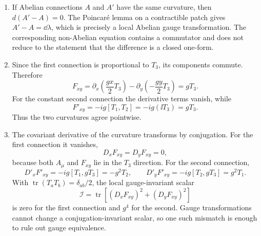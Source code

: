 \begin{enumerate}
  \begin{enumerate}
    \item[(a)]
    If Abelian connections \(A\) and \(A'\) have the same curvature, then
    \(d(A'-A)=0\).  The Poincar\'e lemma on a contractible patch gives
    \(A'-A=\dd\lambda\), which is precisely a local Abelian gauge
    transformation.  The corresponding non-Abelian equation contains a
    commutator and does not reduce to the statement that the difference is
    a closed one-form.
    \item[(b)]
    Since the first connection is proportional to \(T_3\), its components
    commute.  Therefore
    \[
      F_{xy}=\partial_x\left(\frac{gx}{2}T_3\right)
       -\partial_y\left(-\frac{gy}{2}T_3\right)=gT_3.
    \]
    For the constant second connection the derivative terms vanish, while
    \[
      F'_{xy}=-ig[T_1,T_2]
        =-ig(\ii T_3)=gT_3.
    \]
    Thus the two curvatures agree pointwise.
    \item[(c)]
    The covariant derivative of the curvature transforms by conjugation.
    For the first connection it vanishes,
    \[
      D_xF_{xy}=D_yF_{xy}=0,
    \]
    because both \(A_\mu\) and \(F_{xy}\) lie in the \(T_3\) direction.
    For the second connection,
    \[
      D'_xF'_{xy}=-ig[T_1,gT_3]=-g^2T_2,
      \qquad
      D'_yF'_{xy}=-ig[T_2,gT_3]=g^2T_1.
    \]
    With \(\operatorname{tr}(T_aT_b)=\delta_{ab}/2\), the local
    gauge-invariant scalar
    \[
      \mathcal I=\operatorname{tr}\!\left[
        (D_xF_{xy})^2+(D_yF_{xy})^2\right]
    \]
    is zero for the first connection and \(g^4\) for the second.  Gauge
    transformations cannot change a conjugation-invariant scalar, so one
    such mismatch is enough to rule out gauge equivalence.
  \end{enumerate}


\end{enumerate}
